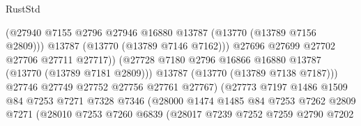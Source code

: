 \begin{lexlean}{RustStd}
\begin{coremodule}
                                          (@27940
                                            @7155
                                            @2796
                                            @27946
                                            @16880
                                            @13787
                                            (@13770 (@13789 @7156 @2809)))
                                          @13787
                                          (@13770 (@13789 @7146 @7162)))
                                        @27696
                                        @27699
                                        @27702
                                        @27706
                                        @27711
                                        @27717))
                                    (@27728
                                      @7180
                                      @2796
                                      @16866
                                      @16880
                                      @13787
                                      (@13770 (@13789 @7181 @2809)))
                                    @13787
                                    (@13770 (@13789 @7138 @7187)))
                                  @27746
                                  @27749
                                  @27752
                                  @27756
                                  @27761
                                  @27767)
                                (@27773
                                  @7197
                                  @1486
                                  @1509
                                  @84
                                  @7253
                                  @7271
                                  @7328
                                  @7346
                                  (@28000
                                    @1474
                                    @1485
                                    @84
                                    @7253
                                    @7262
                                    @2809
                                    @7271
                                    (@28010
                                      @7253
                                      @7260
                                      @6839
                                      (@28017
                                        @7239
                                        @7252
                                        @7259
                                        @2790
                                        @7202

\end{coremodule}
\end{lexlean}
